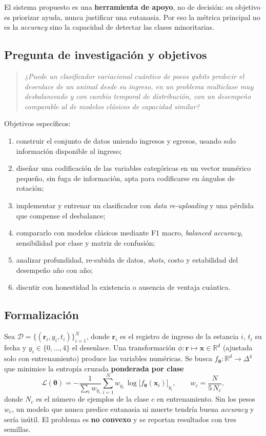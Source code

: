 \documentclass[11pt,letterpaper]{article}
\newcommand{\R}{\mathbb{R}}
\begin{document}
El sistema propuesto es una \textbf{herramienta de apoyo}, no de decisión: su objetivo es priorizar
ayuda, nunca justificar una eutanasia. Por eso la métrica principal no es la \emph{accuracy} sino la
capacidad de detectar las clases minoritarias.

\subsection{Pregunta de investigación y objetivos}
\begin{quote}
\emph{¿Puede un clasificador variacional cuántico de pocos qubits predecir el desenlace de un animal
desde su ingreso, en un problema multiclase muy desbalanceado y con cambio temporal de distribución,
con un desempeño comparable al de modelos clásicos de capacidad similar?}
\end{quote}
Objetivos específicos:
\begin{enumerate}[label=(\roman*),leftmargin=*]
\item construir el conjunto de datos uniendo ingresos y egresos, usando solo información disponible
al ingreso;
\item diseñar una codificación de las variables categóricas en un vector numérico pequeño, sin fuga de
información, apta para codificarse en ángulos de rotación;
\item implementar y entrenar un clasificador con \emph{data re-uploading} y una pérdida que compense
el desbalance;
\item compararlo con modelos clásicos mediante F1 macro, \emph{balanced accuracy}, sensibilidad por
clase y matriz de confusión;
\item analizar profundidad, re-subida de datos, \emph{shots}, costo y estabilidad del desempeño año
con año;
\item discutir con honestidad la existencia o ausencia de ventaja cuántica.
\end{enumerate}

\subsection{Formalización}
Sea $\mathcal{D}=\{(\bm{r}_i,y_i,t_i)\}_{i=1}^{N}$, donde $\bm{r}_i$ es el registro de ingreso de la
estancia $i$, $t_i$ su fecha y $y_i\in\{0,\dots,4\}$ el desenlace. Una transformación
$\phi:\bm{r}\mapsto\bm{x}\in\R^{d}$ (ajustada solo con entrenamiento) produce las variables numéricas.
Se busca $f_{\bm\theta}:\R^{d}\to\Delta^{4}$ que minimice la entropía cruzada \textbf{ponderada por
clase}
\begin{equation}
\mathcal{L}(\bm\theta)=-\frac{1}{\sum_i w_{y_i}}\sum_{i=1}^{N} w_{y_i}\,\log\big[f_{\bm\theta}(\bm{x}_i)\big]_{y_i},
\qquad w_c=\frac{N}{5\,N_c},
\label{eq:loss}
\end{equation}
donde $N_c$ es el número de ejemplos de la clase $c$ en entrenamiento. Sin los pesos $w_c$, un modelo
que nunca predice eutanasia ni muerte tendría buena \emph{accuracy} y sería inútil. El problema es
\textbf{no convexo} y se reportan resultados con tres semillas.
\end{document}
